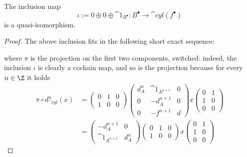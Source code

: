 \begin{lemma}
    The inclusion map 
    $$\iota := 0 \oplus 0 \oplus \cat{1}_{B^{\bullet}} : B^{\bullet}
    \to \cat{cyl}(f^{\bullet})$$
    is a quasi-isomorphism.
    \begin{proof}
        The above inclusion fits in the following
        short exact sequence:
        \begin{center}
        \end{center}
        where $\pi$ is the projection on the first two components, switched:
        indeed, the inclusion $\iota$ is clearly a cochain map,
        and so is the projection because for every $n \in \Z$
        it holds
        \begin{align*}
            \pi \circ d_{\cat{cyl}}^n (x)
            &= 
            \begin{pmatrix}
                0 & 1 & 0 \\
                1 & 0 & 0
            \end{pmatrix}
            \begin{pmatrix}
            d_{A}^{n} & \cat{1}_{A^{n+1}} & 0 \\
            0 & -d^{n+1}_{A} & 0 \\
            0 & -f^{n+1} & d
            \end{pmatrix}
            x
            \begin{pmatrix}
                0 & 1 \\ 1 & 0 \\ 0 & 0
            \end{pmatrix} \\
            &= 
            \begin{pmatrix}
                -d_{A}^{n+1} & 0 \\ \cat{1}_{A^{n+1}} & d_{A}^{n}
            \end{pmatrix}
            \begin{pmatrix}
                0 & 1 & 0 \\
                1 & 0 & 0
            \end{pmatrix}
            x
            \begin{pmatrix}
                0 & 1 \\ 1 & 0 \\ 0 & 0

\end{pmatrix}
\end{align*}
\end{proof}
\end{lemma}
